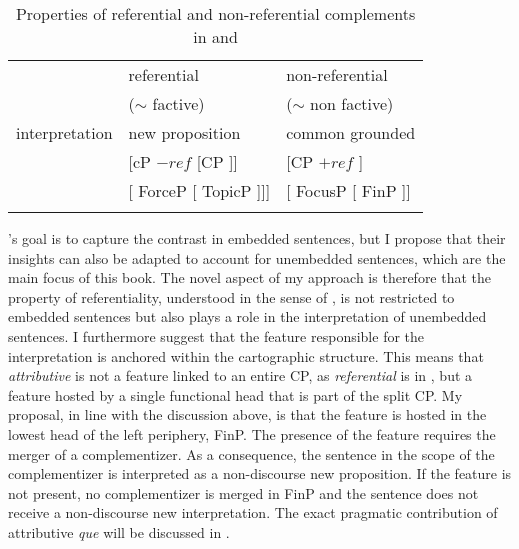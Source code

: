 \begin{table}[htb]
	\centering
	\begin{tabularx}{\textwidth}{l  XX}
\lsptoprule
	&referential 	& non-referential \\
&($\sim$ factive) & ($\sim$ non factive)\\
\midrule 

interpretation & new proposition & common grounded\\
\citet{Cuba2013} &  {[cP ${-ref}$ [CP ]]} & {[CP ${+ref}$ ]}\\
 \citet{VillaGarcia2015}&  {[ ForceP [ TopicP \newline [ FocusP [ FinP ]]]]} & {[ FocusP [ FinP ]]} \\
\lspbottomrule
\end{tabularx}
	\caption{Properties of referential and non-referential complements in  \citet{Cuba2013} and \citet{VillaGarcia2015}}
\end{table}

's goal is to capture the contrast in embedded sentences, but I propose that their insights can also be adapted to account for unembedded sentences, which are the main focus of this book. The novel aspect of my  approach is therefore that the property of referentiality, understood in the sense of \citet{Cuba2013}, is not restricted to embedded sentences but also plays a role in the interpretation of unembedded sentences.  I furthermore suggest that the  feature responsible for the interpretation is anchored within the  cartographic structure. This means that \emph{attributive} is not a feature linked to an entire CP, as \emph{referential} is in \citet{Cuba2013}, but  a feature hosted by a single functional head that is part of  the split CP.  My proposal, in line with the discussion above, is that the feature is hosted in the lowest head of the left periphery, FinP. The presence of the feature requires the merger of a complementizer. As a consequence, the sentence in the scope of the complementizer is interpreted as a non-discourse new proposition.  If the feature is not present,  no complementizer is merged in FinP and the sentence does not receive a non-discourse new interpretation. The exact pragmatic contribution of attributive \emph{que} will be discussed in . 


